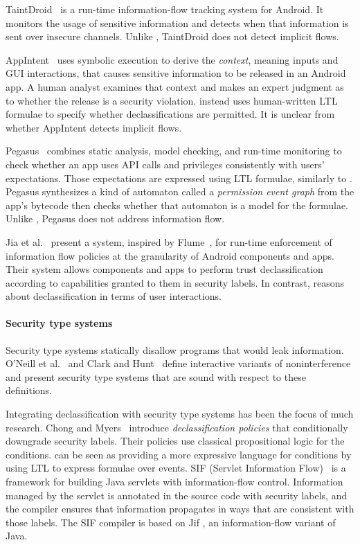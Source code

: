TaintDroid~\cite{Enck:10} is a run-time information-flow tracking system
for Android.  It monitors the usage of sensitive information and detects
when that information is sent over insecure channels.
Unlike \toolname{},
TaintDroid does not detect implicit flows.

AppIntent~\cite{Yang:2013} uses symbolic execution to derive the \emph{context},
meaning inputs and GUI interactions, that causes sensitive information to be
released in an Android app. A human analyst examines that context and makes an
expert judgment as to whether the release is a security violation.  
\toolname instead uses human-written LTL formulae to specify whether 
declassifications are permitted. It is unclear from~\cite{Yang:2013} whether AppIntent detects
implicit flows.

Pegasus~\cite{Chen:13} combines static analysis, model checking,
and run-time monitoring to check whether an app uses API
calls and privileges consistently with users' expectations.
Those expectations are expressed using LTL formulae, similarly to \toolname.
Pegasus synthesizes
a kind of automaton called a \emph{permission event graph} from the
app's bytecode then checks whether that automaton is a model for the formulae.
Unlike \toolname, Pegasus does not address information flow.

Jia et al.~\cite{Jia:13} present a system, inspired by Flume~\cite{Krohn:2007},
for run-time enforcement of information flow policies at the granularity of 
Android components and apps.  Their system allows
components and apps to perform trust declassification according to 
capabilities granted to them in security labels.  In contrast,
\toolname reasons about declassification in terms of user
interactions.

\paragraph*{Security type systems}

Security type systems \cite{Volpano:1996} statically disallow programs
that would leak information. O'Neill et al.~\cite{O'Neill:2006} and
Clark and Hunt~\cite{Clark:09} define interactive variants of
noninterference and present security type systems that are sound with
respect to these definitions.

Integrating declassification with security type systems has been the
focus of much research.  Chong and Myers~\cite{Chong:04} introduce
\emph{declassification policies} that conditionally downgrade security labels.
Their policies use classical propositional logic for the conditions.  
\toolname can be seen as providing a more expressive language for
conditions by using LTL to express formulae over events.  
%
SIF (Servlet Information Flow)~\cite{Chong:07} is a framework for
building Java servlets with information-flow control.  Information
managed by the servlet is annotated in the source code with security
labels, and the compiler ensures that information propagates in ways
that are consistent with those labels.  The SIF compiler is based on
Jif \cite{Myers:1999}, an information-flow variant of Java.

